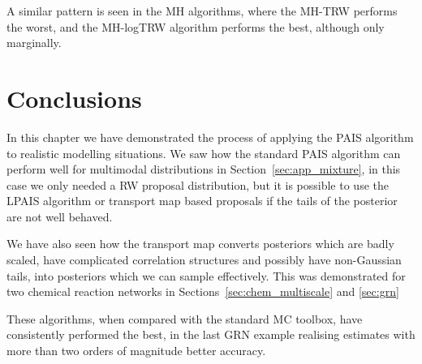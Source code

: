\documentclass[final]{siamltex}
\begin{document}
A similar pattern is seen in the MH algorithms, where the MH-TRW performs the worst, and the MH-logTRW algorithm performs the best, although only marginally.

\section{Conclusions}

In this chapter we have demonstrated the process of applying the PAIS algorithm to realistic modelling situations. We saw how the standard PAIS algorithm can perform well for multimodal distributions in Section~\ref{sec:app_mixture}, in this case we only needed a RW proposal distribution, but it is possible to use the LPAIS algorithm or transport map based proposals if the tails of the posterior are not well behaved.

We have also seen how the transport map converts posteriors which are badly scaled, have complicated correlation structures and possibly have non-Gaussian tails, into posteriors which we can sample effectively. This was demonstrated for two chemical reaction networks in Sections~\ref{sec:chem_multiscale} and \ref{sec:grn}

These algorithms, when compared with the standard MC toolbox, have consistently performed the best, in the last GRN example realising estimates with more than two orders of magnitude better accuracy.



\end{document}
